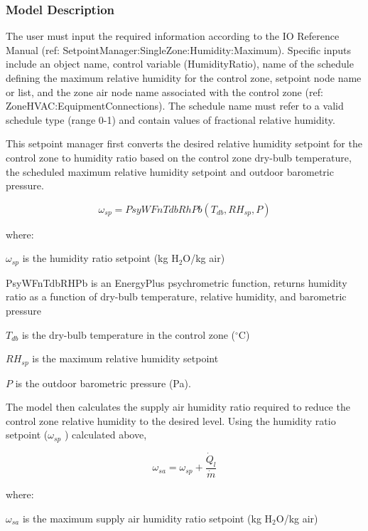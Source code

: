 \subsubsection{Model Description}\label{model-description-014}

The user must input the required information according to the IO Reference Manual (ref: SetpointManager:SingleZone:Humidity:Maximum). Specific inputs include an object name, control variable (HumidityRatio), name of the schedule defining the maximum relative humidity for the control zone, setpoint node name or list, and the zone air node name associated with the control zone (ref: ZoneHVAC:EquipmentConnections). The schedule name must refer to a valid schedule type (range 0-1) and contain values of fractional relative humidity.

This setpoint manager first converts the desired relative humidity setpoint for the control zone to humidity ratio based on the control zone dry-bulb temperature, the scheduled maximum relative humidity setpoint and outdoor barometric pressure.

\begin{equation}
{\omega_{sp}} = {PsyWFnTdbRhPb}\left( {{T_{db}},R{H_{sp}},P} \right)
\end{equation}

where:

\({\omega_{sp}}\) is the humidity ratio setpoint (kg H\(_{2}\)O/kg air)

PsyWFnTdbRHPb is an EnergyPlus psychrometric function, returns humidity ratio as a function of dry-bulb temperature, relative humidity, and barometric pressure

\({T_{db}}\) is the dry-bulb temperature in the control zone (\(^{\circ}\)C)

\(R{H_{sp}}\) is the maximum relative humidity setpoint

\(P\) is the outdoor barometric pressure (Pa).

The model then calculates the supply air humidity ratio required to reduce the control zone relative humidity to the desired level. Using the humidity ratio setpoint (\({\omega_{sp}}\) ) calculated above,

\begin{equation}
{\omega_{sa}} = {\omega_{sp}} + \frac{\dot{Q}_l}{\dot{m}}
\end{equation}

where:

\({\omega_{sa}}\) is the maximum supply air humidity ratio setpoint (kg H\(_{2}\)O/kg air)

